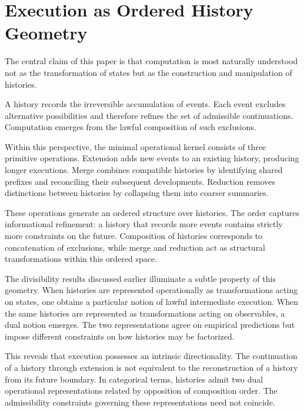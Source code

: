 \documentclass[12pt]{article}
\begin{document}
\section{Execution as Ordered History Geometry}
\label{sec:geometry}

The central claim of this paper is that computation is most naturally understood not as the
transformation of states but as the construction and manipulation of histories.

A history records the irreversible accumulation of events. Each event excludes alternative
possibilities and therefore refines the set of admissible continuations. Computation emerges
from the lawful composition of such exclusions.

Within this perspective, the minimal operational kernel consists of three primitive operations.
Extension adds new events to an existing history, producing longer executions. Merge combines
compatible histories by identifying shared prefixes and reconciling their subsequent
developments. Reduction removes distinctions between histories by collapsing them into coarser
summaries.

These operations generate an ordered structure over histories. The order captures informational
refinement: a history that records more events contains strictly more constraints on the future.
Composition of histories corresponds to concatenation of exclusions, while merge and reduction
act as structural transformations within this ordered space.

The divisibility results discussed earlier illuminate a subtle property of this geometry. When
histories are represented operationally as transformations acting on states, one obtains a
particular notion of lawful intermediate execution. When the same histories are represented as
transformations acting on observables, a dual notion emerges. The two representations agree on
empirical predictions but impose different constraints on how histories may be factorized.

This reveals that execution possesses an intrinsic directionality. The continuation of a history
through extension is not equivalent to the reconstruction of a history from its future boundary.
In categorical terms, histories admit two dual operational representations related by opposition
of composition order. The admissibility constraints governing these representations need not
coincide.
\end{document}
